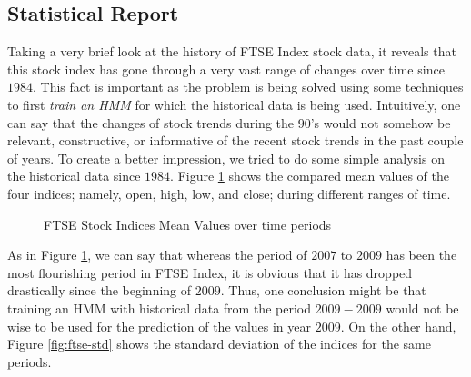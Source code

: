 \documentclass{acm_proc_article-sp}
\begin{document}
\subsection{Statistical Report} \label{sec:stats}
Taking a very brief look at the history of FTSE Index stock data, it reveals that this stock index has gone through a
very vast range of changes over time since $1984$. This fact is important as the problem is being solved using some
techniques to first \textit{train an HMM} for which the historical data is being used. Intuitively, one can say that
the changes of stock trends during the $90$'s would not somehow be relevant, constructive, or informative of the recent
stock trends in the past couple of years. To create a better impression, we tried to do some simple analysis on the
historical data since $1984$. Figure \ref{fig:ftse-mean} shows the compared mean values of the four indices; namely, open,
high, low, and close; during different ranges of time.

\begin{figure}[h]
\centering
\setlength\fboxsep{0.1pt}
\setlength\fboxrule{0.7pt}
\caption{FTSE Stock Indices Mean Values over time periods} \label{fig:ftse-mean}
\end{figure}

As in Figure \ref{fig:ftse-mean}, we can say that whereas the period of $2007$ to $2009$ has been the most
flourishing period in FTSE Index, it is obvious that it has dropped drastically since the beginning of $2009$. Thus,
one conclusion might be that training an HMM with historical data from the period $2009-2009$ would not be wise to be
used for the prediction of the values in year $2009$. On the other hand, Figure \ref{fig:ftse-std} shows the standard
deviation of the indices for the same periods.
\end{document}
